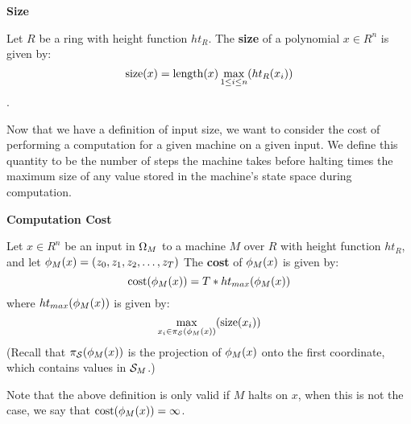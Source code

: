 \begin{definition}{\textbf{Size}}
  
  Let $R$ be a ring with height function $ht_R$.  The \textbf{size} of
  a polynomial $x \in R^n$ is given by:
  $$\text{size}(x) = \text{length}(x)\max_{1 \leq i \leq n}(ht_R(x_i))$$.
\end{definition}

Now that we have a definition of input size, we want to consider the
cost of performing a computation for a given machine on a given input.
We define this quantity to be the number of steps the machine takes
before halting times the maximum size of any value stored in the
machine's state space during computation.

\begin{definition}{\textbf{Computation Cost}}
  \label{def:size}
  
  Let $x \in R^n$ be an input in $\Omega_M$ to a machine $M$ over
  $R$ with height function $ht_R$, and let $\phi_M(x) = (z_0, z_1,
  z_2, \ldots, z_T)$ The \textbf{cost} of $\phi_M(x)$ is given by:
  $$\text{cost}(\phi_M(x)) = T*ht_{max}(\phi_M(x))$$
  where $ht_{max}(\phi_M(x))$ is given by:
  $$\max_{x_i \in \pi_{\mathcal{S}}(\phi_M(x))}(\text{size}(x_i))$$
  (Recall that $\pi_{\mathcal{S}}(\phi_M(x))$ is the projection of
  $\phi_M(x)$ onto the first coordinate, which contains values in
  $\mathcal{S}_M$.)\\


  Note that the above definition is only valid if $M$ halts on $x$,
  when this is not the case, we say that $\text{cost}(\phi_M(x)) = \infty$.

  
\end{definition}

